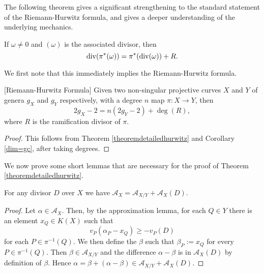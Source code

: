 The following theorem gives a significant strengthening to the standard statement of the Riemann-Hurwitz formula, and gives a deeper understanding of the underlying mechanics.
    \begin{thm}
    If $\omega\neq 0$ and $(\omega)$ is the associated divisor, then 
        \[
        \operatorname{div} ( \pi^*(\omega)) = \pi^*(\operatorname{div}(\omega)) + R.
        \]
    \end{thm}

We first note that this immediately implies the Riemann-Hurwitz formula.

    \begin{cor}\label{hur}[Riemann-Hurwitz Formula]
    Given two non-singular projective curves $X$ and $Y$ of genera $g_X$ and $g_Y$ respectively, with a degree $n$ map $\pi\colon X \rightarrow Y$, then
        \[
        2g_X - 2 = n(2g_Y -2) + \deg(R),
        \]
    where $R$ is the ramification divisor of $\pi$.
    \end{cor}
    \begin{proof}
    This follows from Theorem \ref{theoremdetailedhurwitz} and Corollary \ref{dim=gc}, after taking degrees.
    \end{proof}


We now prove some short lemmas that are necessary for the proof of Theorem \ref{theoremdetailedhurwitz}.


    \begin{lem}\label{lemmaadelespace}
    For any divisor $D$ over $X$ we have $\mathcal {A}_X = \mathcal{A}_{X/Y} + \mathcal{A}_X(D)$.
    \end{lem}
    \begin{proof}
    Let $\alpha \in \mathcal{A}_X$. Then, by the approximation lemma, for each $Q\in Y$ there is an element $x_Q\in K(X)$ such that 
        \[
        v_P(\alpha_P - x_Q) \geq -v_P(D)
        \]
    for each $P\in \pi^{-1}(Q)$. 
    We then define the \adele $\beta$ such that $\beta_P := x_Q$ for every $P\in \pi^{-1}(Q)$.
    Then $\beta \in \mathcal{A}_{X/Y}$ and the difference $\alpha - \beta$ is in $\mathcal{A}_X(D)$ by definition of $\beta$.
    Hence $\alpha = \beta + (\alpha - \beta) \in \mathcal{A}_{X/Y} + \mathcal{A}_X(D)$.
    \end{proof}

